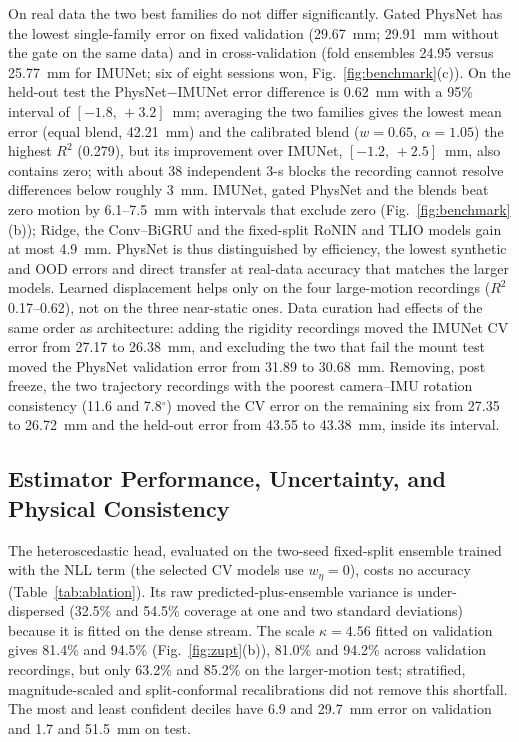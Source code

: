 On real data the two best families do not differ significantly. Gated PhysNet
has the lowest single-family error on fixed validation (29.67~mm; 29.91~mm
without the gate on the same data) and in cross-validation (fold ensembles
24.95 versus 25.77~mm for IMUNet; six of eight sessions won,
Fig.~\ref{fig:benchmark}(c)). On the held-out test the PhysNet$-$IMUNet error
difference is 0.62~mm with a 95\% interval of $[-1.8,\,+3.2]$~mm; averaging the
two families gives the lowest mean error (equal blend, 42.21~mm) and the
calibrated blend ($w=0.65$, $\alpha=1.05$) the highest $R^2$ (0.279), but its
improvement over IMUNet, $[-1.2,\,+2.5]$~mm, also contains zero; with about 38
independent 3-s blocks the recording cannot resolve differences below roughly
3~mm. IMUNet, gated PhysNet and the blends beat zero motion by 6.1--7.5~mm with
intervals that exclude zero (Fig.~\ref{fig:benchmark}(b)); Ridge, the
Conv--BiGRU and the fixed-split RoNIN and TLIO models gain at most 4.9~mm.
PhysNet is thus distinguished by efficiency, the lowest synthetic and OOD
errors and direct transfer at real-data accuracy that matches the larger
models. Learned displacement helps only on the four large-motion recordings
($R^2$ 0.17--0.62), not on the three near-static ones.
Data curation had effects of the same order as architecture: adding the
rigidity recordings moved the IMUNet CV error from 27.17 to 26.38~mm, and
excluding the two that fail the mount test moved the PhysNet validation error
from 31.89 to 30.68~mm. Removing, post freeze, the two trajectory recordings
with the poorest camera--IMU rotation consistency (11.6 and 7.8$^\circ$) moved
the CV error on the remaining six from 27.35 to 26.72~mm and the held-out error
from 43.55 to 43.38~mm, inside its interval.

\subsection{Estimator Performance, Uncertainty, and Physical Consistency}
The heteroscedastic head, evaluated on the two-seed fixed-split ensemble
trained with the NLL term (the selected CV models use $w_\eta=0$), costs no
accuracy (Table~\ref{tab:ablation}). Its raw predicted-plus-ensemble variance
is under-dispersed (32.5\% and 54.5\% coverage at one and two standard
deviations) because it is fitted on the dense stream. The scale $\kappa=4.56$
fitted on validation gives 81.4\% and 94.5\% (Fig.~\ref{fig:zupt}(b)), 81.0\%
and 94.2\% across validation recordings, but only 63.2\% and 85.2\% on the
larger-motion test; stratified, magnitude-scaled and split-conformal
recalibrations did not remove this shortfall. The most and least confident
deciles have 6.9 and 29.7~mm error on validation and 1.7 and 51.5~mm on test.

